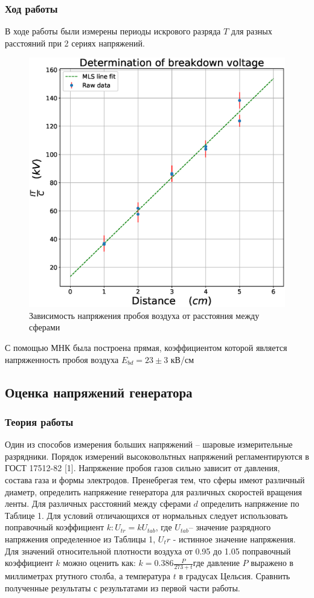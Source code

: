 \documentclass[a4paper,14pt]{extarticle}
\begin{document}
			\subsubsection{Ход работы}
				В ходе работы были измерены периоды искрового разряда $T$ для разных расстояний при 2 сериях напряжений.
				\begin{figure}[h]
					\centering
				 	\includegraphics[width=.80\linewidth]{Lab1_5.eps}
				 	\caption{Зависимость напряжения пробоя воздуха от расстояния между сферами}
				 	\label{fig9}
				\end{figure}
				\newpage
				С помощью МНК была построена прямая, коэффициентом которой является напряженность пробоя воздуха $E_{bd} = 23 \pm 3$ кВ/см
		\subsection{Оценка напряжений генератора}
			\subsubsection{Теория работы}
				Один из способов измерения больших напряжений – шаровые измерительные разрядники. Порядок измерений высоковольтных напряжений регламентируются в ГОСТ 17512-82 [1]. Напряжение пробоя газов сильно зависит от давления, состава газа и формы
				электродов. Пренебрегая тем, что сферы имеют различный диаметр, определить напряжение генератора для различных скоростей вращения ленты. Для различных расстояний между сферами $d$ определить напряжение по Таблице 1. Для условий отличающихся от нормальных следует использовать поправочный
				коэффициент $k: U_{tr} = k U_{tab}$, где $U_{tab}$– значение разрядного напряжения определенное из Таблицы 1, $U_tr$ - истинное значение напряжения. Для значений относительной плотности воздуха от 0.95 до 1.05 поправочный коэффициент $k$ можно оценить как: $k = 0.386 \frac{P}{273+t}$где давление $P$ выражено в миллиметрах ртутного столба, а температура $t$ в градусах Цельсия.
				\newline
				Сравнить полученные результаты с результатами из первой части работы.
\end{document}

